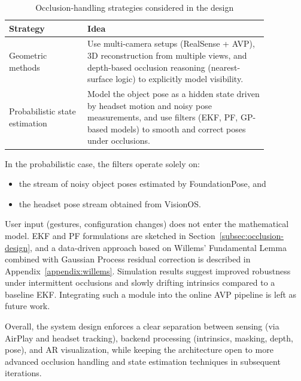 \begin{table}[H]
    \centering
    \caption{Occlusion-handling strategies considered in the design}
    \label{tab:occlusion-strategies}
    \begin{tabular}{p{0.26\linewidth}p{0.6\linewidth}}
        \toprule
        \textbf{Strategy} & \textbf{Idea} \\
        \midrule
        Geometric methods &
        Use multi-camera setups (RealSense + AVP), 3D reconstruction from multiple views, and depth-based occlusion reasoning (nearest-surface logic) to explicitly model visibility. \\
        Probabilistic state estimation &
        Model the object pose as a hidden state driven by headset motion and noisy pose measurements, and use filters (EKF, PF, GP-based models) to smooth and correct poses under occlusions. \\
        \bottomrule
    \end{tabular}
\end{table}

In the probabilistic case, the filters operate solely on:

\begin{itemize}
    \item the stream of noisy object poses estimated by FoundationPose, and
    \item the headset pose stream obtained from VisionOS.
\end{itemize}

User input (gestures, configuration changes) does not enter the mathematical model. EKF and PF formulations are sketched in Section~\ref{subsec:occlusion-design}, and a data-driven approach based on Willems’ Fundamental Lemma combined with Gaussian Process residual correction is described in Appendix~\ref{appendix:willems}. Simulation results suggest improved robustness under intermittent occlusions and slowly drifting intrinsics compared to a baseline EKF. Integrating such a module into the online AVP pipeline is left as future work.

Overall, the system design enforces a clear separation between sensing (via AirPlay and headset tracking), backend processing (intrinsics, masking, depth, pose), and AR visualization, while keeping the architecture open to more advanced occlusion handling and state estimation techniques in subsequent iterations.
